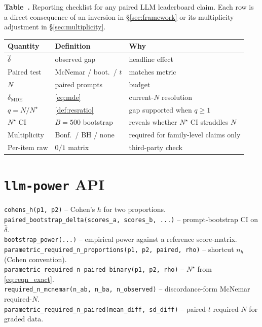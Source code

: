 \documentclass{article}
\theoremstyle{plain}
\theoremstyle{definition}
\begin{document}
\label{tab:checklist}%
\begin{center}\footnotesize\vspace{-1ex}
\textbf{Table~\thetable.} Reporting checklist for any paired LLM leaderboard claim. Each row is a direct consequence of an inversion in \S\ref{sec:framework} or its multiplicity adjustment in \S\ref{sec:multiplicity}.\\[3pt]
\setlength{\tabcolsep}{4pt}
\begin{tabular}{@{}ll>{\raggedright\arraybackslash}p{}@{}}
\toprule
Quantity & Definition & Why \\
\midrule
$\hat\delta$               & observed gap                 & headline effect \\
Paired test                & McNemar / boot.\ / $t$       & matches metric \\
$N$                        & paired prompts                & budget \\
$\delta_{\mathrm{MDE}}$    & \cref{eq:mde}                 & current-$N$ resolution \\
$q = N/N^{\star}$           & \cref{def:resratio}           & gap supported when $q\ge 1$ \\
$N^{\star}$ CI             & $B{=}500$ bootstrap           & reveals whether $N^{\star}$ CI straddles $N$ \\
Multiplicity               & Bonf.\ / BH / none           & required for family-level claims only \\
Per-item raw               & $0/1$ matrix                  & third-party check \\
\bottomrule
\end{tabular}
\end{center}

\section{\texttt{llm-power} API}
\label{app:api}

\noindent\texttt{cohens\_h(p1, p2)} -- Cohen's $h$ for two proportions.\\
\texttt{paired\_bootstrap\_delta(scores\_a, scores\_b, ...)} -- prompt-bootstrap CI on $\hat\delta$.\\
\texttt{bootstrap\_power(...)} -- empirical power against a reference score-matrix.\\
\texttt{parametric\_required\_n\_proportions(p1, p2, paired, rho)} -- shortcut $n_h$ (Cohen convention).\\
\texttt{parametric\_required\_n\_paired\_binary(p1, p2, rho)} -- $N^{\star}$ from \cref{eq:reqn_exact}.\\
\texttt{required\_n\_mcnemar(n\_ab, n\_ba, n\_observed)} -- discordance-form McNemar required-$N$.\\
\texttt{parametric\_required\_n\_paired(mean\_diff, sd\_diff)} -- paired-$t$ required-$N$ for graded data.
\end{document}
